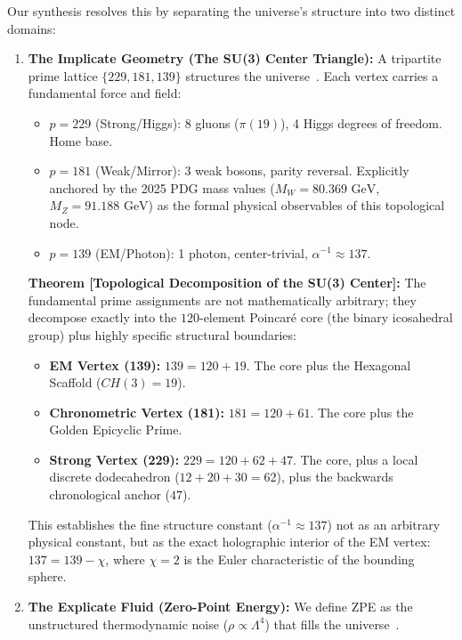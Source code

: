 Our synthesis resolves this by separating the universe's structure into two distinct domains:
\begin{enumerate}
    \item \textbf{The Implicate Geometry (The SU(3) Center Triangle):} A tripartite prime lattice $\{229, 181, 139\}$ structures the universe~\cite{larue2026chromatic}. Each vertex carries a fundamental force and field:
    \begin{itemize}
        \item $p=229$ (Strong/Higgs): 8 gluons ($\pi(19)$), 4 Higgs degrees of freedom. Home base.
        \item $p=181$ (Weak/Mirror): 3 weak bosons, parity reversal. Explicitly anchored by the 2025 PDG mass values ($M_W = 80.369 \text{ GeV}$, $M_Z = 91.188 \text{ GeV}$) as the formal physical observables of this topological node.
        \item $p=139$ (EM/Photon): 1 photon, center-trivial, $\alpha^{-1} \approx 137$.
    \end{itemize}

    \textbf{Theorem [Topological Decomposition of the SU(3) Center]:} The fundamental prime assignments are not mathematically arbitrary; they decompose exactly into the $120$-element Poincaré core (the binary icosahedral group) plus highly specific structural boundaries:
    \begin{itemize}
        \item \textbf{EM Vertex (139):} $139 = 120 + 19$. The core plus the Hexagonal Scaffold ($CH(3) = 19$).
        \item \textbf{Chronometric Vertex (181):} $181 = 120 + 61$. The core plus the Golden Epicyclic Prime.
        \item \textbf{Strong Vertex (229):} $229 = 120 + 62 + 47$. The core, plus a local discrete dodecahedron ($12 + 20 + 30 = 62$), plus the backwards chronological anchor ($47$).
    \end{itemize}
    This establishes the fine structure constant ($\alpha^{-1} \approx 137$) not as an arbitrary physical constant, but as the exact holographic interior of the EM vertex: $137 = 139 - \chi$, where $\chi=2$ is the Euler characteristic of the bounding sphere.
    
    \item \textbf{The Explicate Fluid (Zero-Point Energy):} We define ZPE as the unstructured thermodynamic noise ($\rho \propto \Lambda^4$) that fills the universe~\cite{lockwood2025zpe, lockwood2025dwm}.
\end{enumerate}

